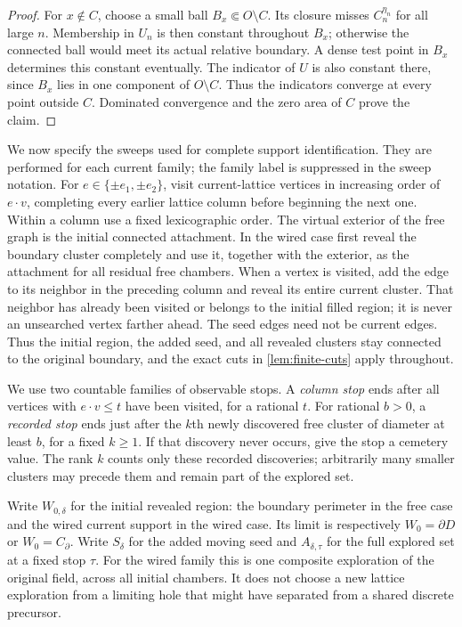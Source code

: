 \begin{proof}
For \(x\notin C\), choose a small ball \(B_x\Subset O\setminus C\).
Its closure misses \(C_n^{\eta_n}\) for all large \(n\). Membership
in \(U_n\) is then constant throughout \(B_x\); otherwise the connected
ball would meet its actual relative boundary. A dense test point in
\(B_x\) determines this constant eventually. The indicator of \(U\)
is also constant there, since \(B_x\) lies in one component of
\(O\setminus C\). Thus the indicators converge at every point outside
\(C\). Dominated convergence and the zero area of \(C\) prove the claim.
\end{proof}

We now specify the sweeps used for complete support identification.
They are performed for each current family; the family label is
suppressed in the sweep notation.
For \(e\in\{\pm e_1,\pm e_2\}\), visit current-lattice vertices in
increasing order of \(e\cdot v\), completing every earlier lattice
column before beginning the next one. Within a column use a fixed
lexicographic order. The virtual exterior of the free graph is the
initial connected attachment. In the wired case first reveal the
boundary cluster completely and use it, together with the exterior,
as the attachment for all residual free chambers. When a vertex is
visited, add the edge to its neighbor in the preceding column and
reveal its entire current cluster. That neighbor has already been
visited or belongs to the initial filled region; it is never an
unsearched vertex farther ahead. The seed edges need not be current
edges. Thus the initial region, the added seed, and all revealed
clusters stay connected to the original boundary, and the exact cuts
in \cref{lem:finite-cuts} apply throughout.

We use two countable families of observable stops. A \emph{column stop}
ends after all vertices with \(e\cdot v\leq t\) have been visited, for
a rational \(t\). For rational \(b>0\), a \emph{recorded stop} ends just
after the \(k\)th newly discovered free cluster of diameter at least
\(b\), for a fixed \(k\geq1\). If that discovery never occurs, give
the stop a cemetery value. The rank \(k\) counts only these recorded
discoveries; arbitrarily many smaller clusters may precede them and
remain part of the explored set.

Write \(W_{0,\delta}\) for the initial revealed region: the boundary
perimeter in the free case and the wired current support in the wired
case. Its limit is respectively \(W_0=\partial D\) or
\(W_0=C_\partial\). Write \(S_\delta\) for the added moving seed and
\(A_{\delta,\tau}\) for the full explored set at a fixed stop \(\tau\).
For the wired family this is one composite exploration of the original
field, across all initial chambers. It does not choose a new lattice
exploration from a limiting hole that might have separated from a
shared discrete precursor.

